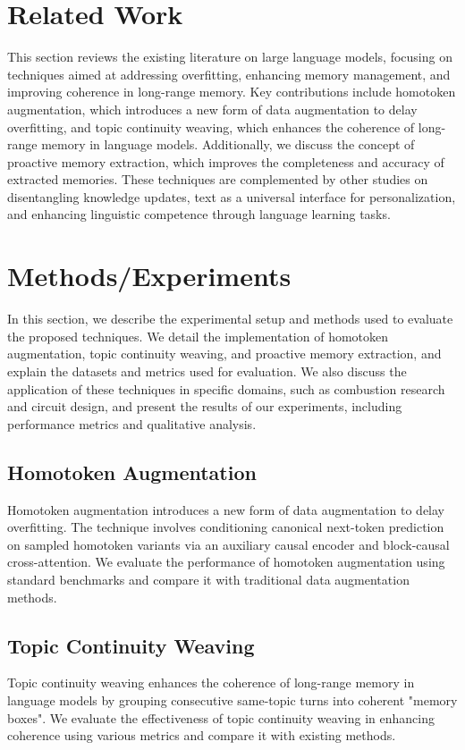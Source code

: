 \documentclass{article}
\begin{document}
\section{Related Work}
This section reviews the existing literature on large language models, focusing on techniques aimed at addressing overfitting, enhancing memory management, and improving coherence in long-range memory. Key contributions include homotoken augmentation, which introduces a new form of data augmentation to delay overfitting, and topic continuity weaving, which enhances the coherence of long-range memory in language models. Additionally, we discuss the concept of proactive memory extraction, which improves the completeness and accuracy of extracted memories. These techniques are complemented by other studies on disentangling knowledge updates, text as a universal interface for personalization, and enhancing linguistic competence through language learning tasks.

\section{Methods/Experiments}
In this section, we describe the experimental setup and methods used to evaluate the proposed techniques. We detail the implementation of homotoken augmentation, topic continuity weaving, and proactive memory extraction, and explain the datasets and metrics used for evaluation. We also discuss the application of these techniques in specific domains, such as combustion research and circuit design, and present the results of our experiments, including performance metrics and qualitative analysis.

\subsection{Homotoken Augmentation}
Homotoken augmentation introduces a new form of data augmentation to delay overfitting. The technique involves conditioning canonical next-token prediction on sampled homotoken variants via an auxiliary causal encoder and block-causal cross-attention. We evaluate the performance of homotoken augmentation using standard benchmarks and compare it with traditional data augmentation methods.

\subsection{Topic Continuity Weaving}
Topic continuity weaving enhances the coherence of long-range memory in language models by grouping consecutive same-topic turns into coherent "memory boxes". We evaluate the effectiveness of topic continuity weaving in enhancing coherence using various metrics and compare it with existing methods.
\end{document}
